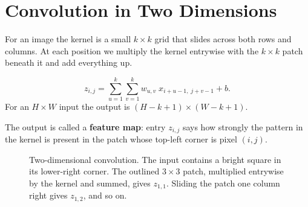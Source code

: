 \documentclass[12pt, a4paper]{article}
\providecommand{\bZ}{\mathbf{Z}}
\newcommand{\drawgrid}[3]{%
  \begin{scope}[shift={#1}]
    \foreach \row [count=\r] in {#3} {
        \foreach \v [count=\c] in \row {
            \draw[gray!70, fill=#2] (\c-1,-\r+1) rectangle ++(1,-1);
            \node[font=\small] at (\c-0.5,-\r+0.5) {$\v$};
          }
      }
  \end{scope}%
}
\begin{document}
\section{Convolution in Two Dimensions}

For an image the kernel is a small $k \times k$ grid that slides across both
rows and columns. At each position we multiply the kernel entrywise with the
$k \times k$ patch beneath it and add everything up.

\begin{resultbox}
  \[
    z_{i,j} = \sum_{u=1}^{k} \sum_{v=1}^{k} w_{u,v}\; x_{i+u-1,\; j+v-1} + b .
  \]
  For an $H \times W$ input the output is
  $(H - k + 1) \times (W - k + 1)$.
\end{resultbox}

The output is called a \textbf{feature map}: entry $z_{i,j}$ says how
strongly the pattern in the kernel is present in the patch whose top-left
corner is pixel $(i, j)$.

\begin{figure}[H]
  \centering
  \caption{Two-dimensional convolution. The input contains a bright square in
    its lower-right corner. The outlined $3\times3$ patch, multiplied entrywise
    by the kernel and summed, gives $z_{1,1}$. Sliding the patch one column
    right gives $z_{1,2}$, and so on.}
  \label{fig:conv2d}
\end{figure}
\end{document}

